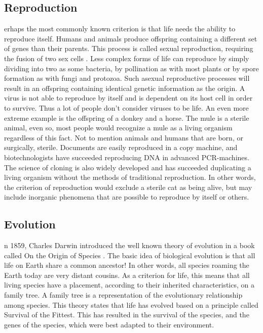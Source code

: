 \subsection{Reproduction}
erhaps the most commonly known criterion is that life needs the ability to reproduce itself.
Humans and animals produce offspring containing a different set of genes than their parents.
This process is called sexual reproduction, requiring the fusion of two sex cells \cite{reprod}.
Less complex forms of life can reproduce by simply dividing into two as some bacteria, by pollination as with most plants or by spore formation as with fungi and protozoa.
Such asexual reproductive processes will result in an offspring containing identical genetic information as the origin.
A virus is not able to reproduce by itself and is dependent on its host cell in order to survive.
Thus a lot of people don't consider viruses to be life.
An even more extreme example is the offspring of a donkey and a horse.
The mule is a sterile animal, even so, most people would recognize a mule as a living organism regardless of this fact. 
Not to mention animals and humans that are born, or surgically, sterile.
Documents are easily reproduced in a copy machine, and biotechnologists have succeeded reproducing DNA in advanced PCR-machines.
The science of cloning is also widely developed and has succeeded duplicating a living organism without the methods of traditional reproduction.
In other words, the criterion of reproduction would exclude a sterile cat as being alive, but may include inorganic phenomena that are possible to reproduce by itself or others.

\subsection{Evolution}
n 1859, Charles Darwin introduced the well known theory of evolution in a book called On the Origin of Species \cite{Darwin}.
The basic idea of biological evolution is that all life on Earth share a common ancestor!
In other words, all species roaming the Earth today are very distant cousins.
As a criterion for life, this means that all living species have a placement, according to their inherited characteristics, on a family tree.
A family tree is a representation of the evolutionary relationship among species.
This theory states that life has evolved based on a principle called Survival of the Fittest.
This has resulted in the survival of the species, and the genes of the species, which were best adapted to their environment. 

